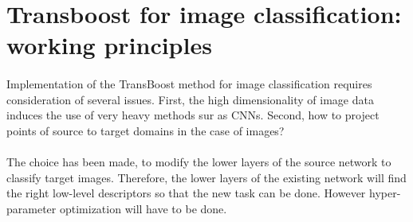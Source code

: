 \documentclass[11 pt]{article}
\begin{document}
\section{Transboost for image classification: working principles}

\paragraph{} Implementation of the TransBoost method for image classification requires consideration of several issues. First, the high dimensionality of image data induces the use of very heavy methods sur as CNNs. Second, how to project points of source to target domains in the case of images? 

\paragraph{} The choice has been made, to modify the lower layers of the source network to classify target images. Therefore, the lower layers of the existing network will find the right low-level descriptors so that the new task can be done. However hyper-parameter optimization will have to be done.
\end{document}
